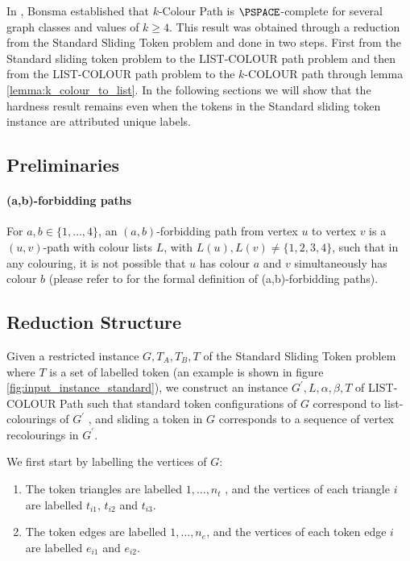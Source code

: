 In \cite{bonsma}, Bonsma established that $k$-Colour Path is $\PSPACE$-complete for several graph classes and values of $k \geq 4$.
This result was obtained through a reduction from the Standard Sliding Token problem and done in two steps. First from the Standard
sliding token problem to the LIST-COLOUR path problem and then from the LIST-COLOUR path problem to the $k$-COLOUR path through lemma
\ref{lemma:k_colour_to_list}. In the following sections we will show that the hardness result remains even when the tokens in the
Standard sliding token instance are attributed unique labels.

\subsection{Preliminaries}
\paragraph{(a,b)-forbidding paths} For $a, b \in \{1, \dots, 4\}$,  an $(a, b)$-forbidding path from vertex $u$ to vertex $v$ is a
$(u, v)$-path with colour lists $L$, with $L(u), L(v) \neq \{1, 2, 3, 4\}$, such that in any colouring, it is not possible that
$u$ has colour $a$ and $v$ simultaneously has colour $b$ (please refer to \cite{bonsma} for the formal definition of (a,b)-forbidding paths).


\subsection{Reduction Structure}
Given a restricted instance $G, T_{A}, T_{B}, T$ of the Standard Sliding Token problem where $T$ is a set of labelled token (an example is
shown in figure \ref{fig:input_instance_standard}), we construct an instance $G^{'}, L, \alpha, \beta, T$ of LIST-COLOUR Path such that
standard token configurations of $G$ correspond to list-colourings of $G^{'}$ , and sliding a token in $G$ corresponds to a
sequence of vertex recolourings in $G^{'}$.

We first start by labelling the vertices of $G$:
\begin{enumerate}
    \item The token triangles are labelled $1, \dots , n_{t}$ , and the vertices of each triangle $i$ are labelled
    $t_{i1}$, $t_{i2}$ and $t_{i3}$.
    \item The token edges are labelled $1, \dots , n_{e}$, and the vertices of each token edge $i$ are labelled
    $e_{i1}$ and $e_{i2}$.
\end{enumerate}

